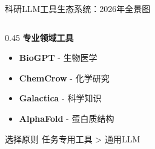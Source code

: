 \documentclass[aspectratio=169,11pt]{beamer}
\begin{document}
\begin{frame}{科研LLM工具生态系统：2026年全景图}
\begin{columns}
\begin{column}{0.45\textwidth}
            \vspace{0.3cm}
            \textbf{专业领域工具}
            \begin{itemize}
                \item \textbf{BioGPT} - 生物医学
                \item \textbf{ChemCrow} - 化学研究
                \item \textbf{Galactica} - 科学知识
                \item \textbf{AlphaFold} - 蛋白质结构
            \end{itemize}
            
            \vspace{0.2cm}
            \begin{alertblock}{选择原则}
                \small
                任务专用工具 > 通用LLM
            \end{alertblock}
        \end{column}
    \end{columns}
\end{frame}
\end{document}
